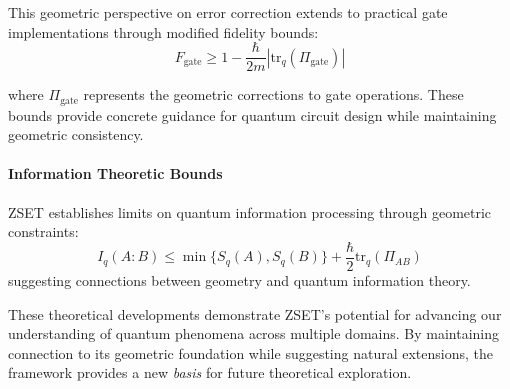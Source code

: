 \documentclass[10pt]{article}
\begin{document}
This geometric perspective on error correction extends to practical gate implementations through modified fidelity bounds:
\[
F_\text{gate} \geq 1 - \frac{\hbar}{2m}|\text{tr}_q(\Pi_\text{gate})|
\]

where $\Pi_\text{gate}$ represents the geometric corrections to gate operations. These bounds provide concrete guidance for quantum circuit design while maintaining geometric consistency.

\paragraph{Information Theoretic Bounds}

ZSET establishes limits on quantum information processing through geometric constraints:
\[
I_q(A:B) \leq \min\{S_q(A), S_q(B)\} + \frac{\hbar}{2}\text{tr}_q(\Pi_{AB})
\]
suggesting connections between geometry and quantum information theory.

These theoretical developments demonstrate ZSET's potential for advancing our understanding of quantum phenomena across multiple domains. By maintaining connection to its geometric foundation while suggesting natural extensions, the framework provides a new \emph{basis} for future theoretical exploration.

\newpage

%
%
\end{document}
